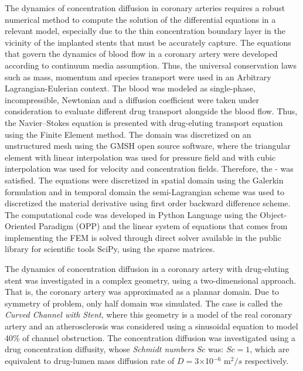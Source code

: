 \documentclass[10pt,fleqn,a4paper,twoside]{article}
\begin{document}
\medskip
The dynamics of concentration diffusion in coronary arteries 
requires a robust numerical method to compute the solution 
of the differential equations in a relevant model,
especially due to the thin concentration boundary layer 
in the vicinity of the implanted
stents that must be accurately capture. 
The equations that govern the dynamics of blood
flow in a coronary artery were developed according 
to continuum media assumption. Thus,
the universal conservation laws such as mass, momentum 
and species transport were used
in an Arbitrary Lagrangian-Eulerian context. 
The blood was modeled as single-phase, incompressible, Newtonian
and a diffusion coefficient were taken under consideration 
to evaluate different drug
transport alongside the blood flow. 
Thus, the Navier--Stokes equation is presented 
with drug-eluting transport equation using
the Finite Element method. 
The domain was discretized on an unstructured mesh using the
GMSH open source software, 
where the triangular element with linear interpolation
was used for pressure field and with cubic interpolation
was used for velocity and concentration fields.
Therefore, the \citeauthor{babuska1971}-\citeauthor{brezzi1974} 
was
satisfied. 
The equations were discretized in spatial domain using the Galerkin formulation
and in temporal domain the semi-Lagrangian scheme 
was used to discretized the material
derivative using first order backward difference scheme. 
The computational code was
developed in Python Language using the Object-Oriented Paradigm (OPP) 
and the linear
system of equations that comes from implementing the FEM is 
solved through direct solver available in the public 
library for scientific tools SciPy, using the sparse matrices.


\smallskip
The dynamics of
concentration diffusion in a coronary artery with 
drug-eluting stent was investigated in
a complex geometry, using a two-dimensional approach. 
That is, the coronary artery
was approximated as a plannar domain. 
Due to symmetry of problem, only half domain
was simulated. 
The case is called the \textit{Curved Channel with Stent}, 
where this geometry is a model of the real coronary artery and 
an atherosclerosis was considered using a sinusoidal
equation to model 40\% of channel obstruction.
The concentration diffusion was investigated using 
a drug concentration diffusity, 
whose \textit{Schmidt numbers} $Sc$
was: $Sc = 1$, which are equivalent to drug-lumen 
mass diffusion rate of
$D = 3$$\times$10$^{−6}$ m$^{2}/s$ respectively.
\end{document}
